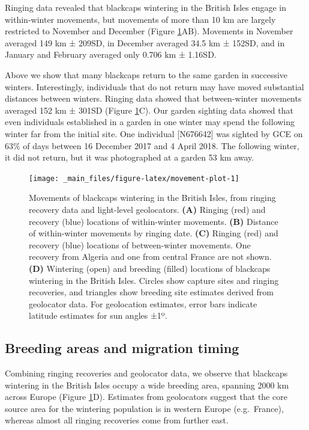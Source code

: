 \documentclass[a4paper, twoside]{templates/ociamthesis}
\begin{document}
Ringing data revealed that blackcaps wintering in the British Isles engage in within-winter movements, but movements of more than 10 km are largely restricted to November and December (Figure \ref{fig:movement-plot}AB). Movements in November averaged 149 km ± 209SD, in December averaged 34.5 km ± 152SD, and in January and February averaged only 0.706 km ± 1.16SD.

Above we show that many blackcaps return to the same garden in successive winters. Interestingly, individuals that do not return may have moved substantial distances between winters. Ringing data showed that between-winter movements averaged 152 km ± 301SD (Figure \ref{fig:movement-plot}C). Our garden sighting data showed that even individuals established in a garden in one winter may spend the following winter far from the initial site. One individual {[}N676642{]} was sighted by GCE on 63\% of days between 16 December 2017 and 4 April 2018. The following winter, it did not return, but it was photographed at a garden 53 km away.



\begin{figure}
\texttt{[image: \_main\_files/figure-latex/movement-plot-1]} \caption{Movements of blackcaps wintering in the British Isles, from ringing recovery data and light-level geolocators. \textbf{(A)} Ringing (red) and recovery (blue) locations of within-winter movements. \textbf{(B)} Distance of within-winter movements by ringing date. \textbf{(C)} Ringing (red) and recovery (blue) locations of between-winter movements. One recovery from Algeria and one from central France are not shown. \textbf{(D)} Wintering (open) and breeding (filled) locations of blackcaps wintering in the British Isles. Circles show capture sites and ringing recoveries, and triangles show breeding site estimates derived from geolocator data. For geolocation estimates, error bars indicate latitude estimates for sun angles ±1º.}\label{fig:movement-plot}
\end{figure}

\hypertarget{breeding-areas-and-migration-timing}{%
\subsection{Breeding areas and migration timing}\label{breeding-areas-and-migration-timing}}

Combining ringing recoveries and geolocator data, we observe that blackcaps wintering in the British Isles occupy a wide breeding area, spanning 2000 km across Europe (Figure \ref{fig:movement-plot}D). Estimates from geolocators suggest that the core source area for the wintering population is in western Europe (e.g.~France), whereas almost all ringing recoveries come from further east.
\end{document}
